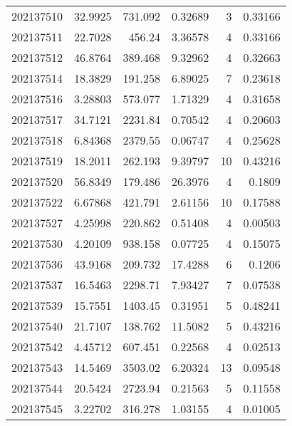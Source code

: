 \begin{tabular}{rrrrrr}
 202137510 &         32.9925  &      731.092  &            0.32689 &           3 & 0.33166 \\
 202137511 &         22.7028  &      456.24   &            3.36578 &           4 & 0.33166 \\
 202137512 &         46.8764  &      389.468  &            9.32962 &           4 & 0.32663 \\
 202137514 &         18.3829  &      191.258  &            6.89025 &           7 & 0.23618 \\
 202137516 &          3.28803 &      573.077  &            1.71329 &           4 & 0.31658 \\
 202137517 &         34.7121  &     2231.84   &            0.70542 &           4 & 0.20603 \\
 202137518 &          6.84368 &     2379.55   &            0.06747 &           4 & 0.25628 \\
 202137519 &         18.2011  &      262.193  &            9.39797 &          10 & 0.43216 \\
 202137520 &         56.8349  &      179.486  &           26.3976  &           4 & 0.1809  \\
 202137522 &          6.67868 &      421.791  &            2.61156 &          10 & 0.17588 \\
 202137527 &          4.25998 &      220.862  &            0.51408 &           4 & 0.00503 \\
 202137530 &          4.20109 &      938.158  &            0.07725 &           4 & 0.15075 \\
 202137536 &         43.9168  &      209.732  &           17.4288  &           6 & 0.1206  \\
 202137537 &         16.5463  &     2298.71   &            7.93427 &           7 & 0.07538 \\
 202137539 &         15.7551  &     1403.45   &            0.31951 &           5 & 0.48241 \\
 202137540 &         21.7107  &      138.762  &           11.5082  &           5 & 0.43216 \\
 202137542 &          4.45712 &      607.451  &            0.22568 &           4 & 0.02513 \\
 202137543 &         14.5469  &     3503.02   &            6.20324 &          13 & 0.09548 \\
 202137544 &         20.5424  &     2723.94   &            0.21563 &           5 & 0.11558 \\
 202137545 &          3.22702 &      316.278  &            1.03155 &           4 & 0.01005 \\

\end{tabular}
